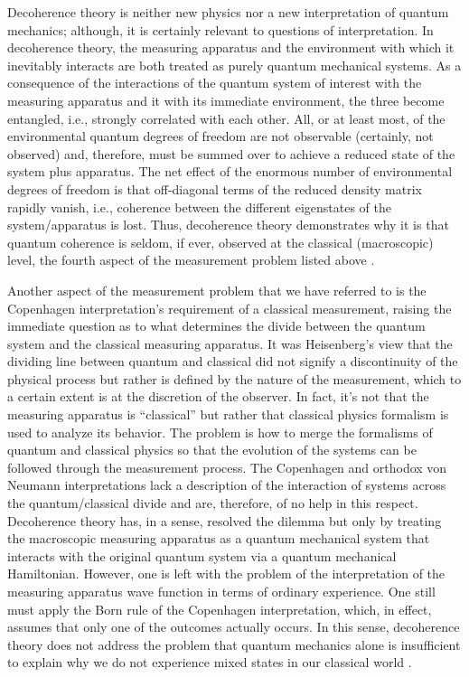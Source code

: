 \documentclass [12pt]{revtex4}
\begin{document}
Decoherence theory is neither new physics nor a new interpretation
of quantum mechanics; although, it is certainly relevant to
questions of interpretation. In decoherence theory, the measuring
apparatus and the environment with which it inevitably interacts are
both treated as purely quantum mechanical systems. As a consequence
of the interactions of the quantum system of interest with the
measuring apparatus and it with its immediate environment, the three
become {entangled}, i.e., strongly correlated with each
other. All, or at least most, of the environmental quantum degrees
of freedom are not observable (certainly, not observed) and,
therefore, must be summed over to achieve a reduced state of the
system plus apparatus. The net effect of the enormous number of
environmental degrees of freedom is that off-diagonal terms of the
reduced density matrix rapidly vanish, i.e., coherence between the
different eigenstates of the system/apparatus is lost.
Thus, decoherence theory demonstrates why it is that quantum
coherence is seldom,
if ever, observed at the classical (macroscopic) level, the fourth
aspect of the measurement problem listed above \cite{S2004}.

Another aspect of the measurement problem that we have referred
to is the
Copenhagen interpretation's requirement of a classical measurement,
raising the immediate question as to what determines the divide
between the quantum system and the classical measuring apparatus. It
was Heisenberg's view \cite{SC2008} that the
dividing line between quantum and classical did not signify a
discontinuity of the physical process but rather is defined by the
nature of the measurement, which to a certain extent is at the
discretion of the observer.  In fact, it’s not that the measuring 
apparatus is ``classical''
but rather that classical physics formalism is used to analyze its
behavior.  The problem is how to merge the formalisms of quantum
and classical physics so that the evolution of the systems can be
followed through the measurement process.  The Copenhagen and
orthodox von Neumann interpretations lack a description of the
interaction of systems across the quantum/classical divide and
are, therefore, of no help in this respect.  Decoherence theory has, 
in a sense, resolved the dilemma but only by
treating the macroscopic measuring apparatus as a quantum mechanical
system that interacts with the original quantum system via a quantum
mechanical Hamiltonian.  However, one is left with the problem of
the interpretation of the measuring apparatus wave function in terms of
ordinary experience. One still must apply the Born rule of
the Copenhagen interpretation, which, in effect, assumes that only
one of the outcomes actually occurs. In this sense, decoherence
theory does not address the problem that quantum mechanics alone is
insufficient to explain why we do not experience mixed states in our
classical world \cite{S2004}.
\end{document}
